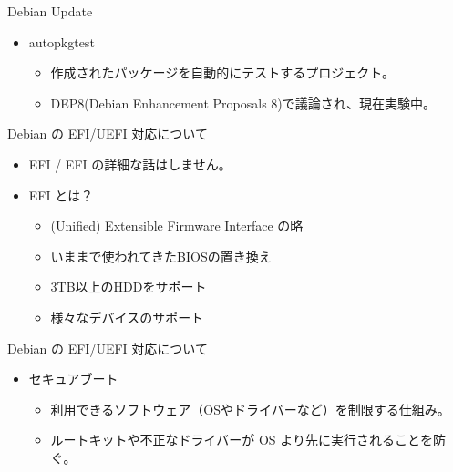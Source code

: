 \begin{frame}{Debian Update}

\begin{itemize}
\item autopkgtest \\
\begin{itemize}
\item 作成されたパッケージを自動的にテストするプロジェクト。\\
\item DEP8(Debian Enhancement Proposals 8)で議論され、現在実験中。
\end{itemize}
\end{itemize}
\end{frame}


\begin{frame}[containsverbatim]{Debian の EFI/UEFI 対応について}
\begin{itemize}
\item EFI / EFI の詳細な話はしません。
\item EFI とは？
\begin{itemize}
\item (Unified) Extensible Firmware Interface の略
\item いままで使われてきたBIOSの置き換え
\item 3TB以上のHDDをサポート
\item 様々なデバイスのサポート
\end{itemize}
\end{itemize}

\end{frame}

\begin{frame}[containsverbatim]{Debian の EFI/UEFI 対応について}

\begin{itemize}
\item セキュアブート
\begin{itemize}
\item 利用できるソフトウェア（OSやドライバーなど）を制限する仕組み。
\item ルートキットや不正なドライバーが OS より先に実行されることを防ぐ。
\end{itemize}
\end{itemize}

\end{frame}

